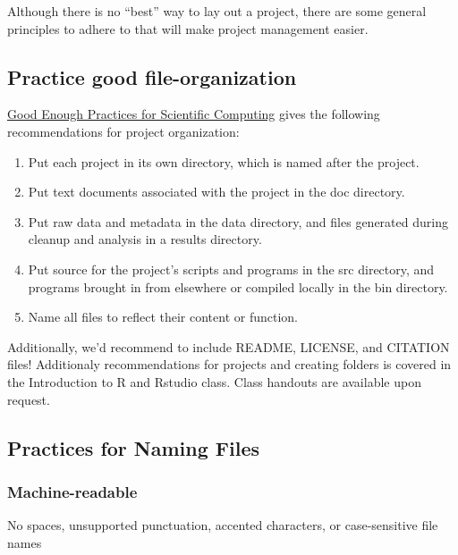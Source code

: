 \documentclass[
]{article}
\providecommand{\tightlist}{%
  \setlength{\itemsep}{0pt}\setlength{\parskip}{0pt}}
\begin{document}
Although there is no ``best'' way to lay out a project, there are some
general principles to adhere to that will make project management
easier.

\hypertarget{practice-good-file-organization}{%
\subsection{Practice good
file-organization}\label{practice-good-file-organization}}

\href{http://swcarpentry.github.io/good-enough-practices-in-scientific-computing/}{Good
Enough Practices for Scientific Computing} gives the following
recommendations for project organization:

\begin{enumerate}
\def\labelenumi{\arabic{enumi}.}
\tightlist
\item
  Put each project in its own directory, which is named after the
  project.
\item
  Put text documents associated with the project in the doc directory.
\item
  Put raw data and metadata in the data directory, and files generated
  during cleanup and analysis in a results directory.
\item
  Put source for the project's scripts and programs in the src
  directory, and programs brought in from elsewhere or compiled locally
  in the bin directory.
\item
  Name all files to reflect their content or function.
\end{enumerate}

Additionally, we'd recommend to include README, LICENSE, and CITATION
files! Additionaly recommendations for projects and creating folders is
covered in the Introduction to R and Rstudio class. Class handouts are
available upon request.

\hypertarget{practices-for-naming-files}{%
\subsection{Practices for Naming
Files}\label{practices-for-naming-files}}

\hypertarget{machine-readable}{%
\subsubsection{Machine-readable}\label{machine-readable}}

No spaces, unsupported punctuation, accented characters, or
case-sensitive file names
\end{document}
